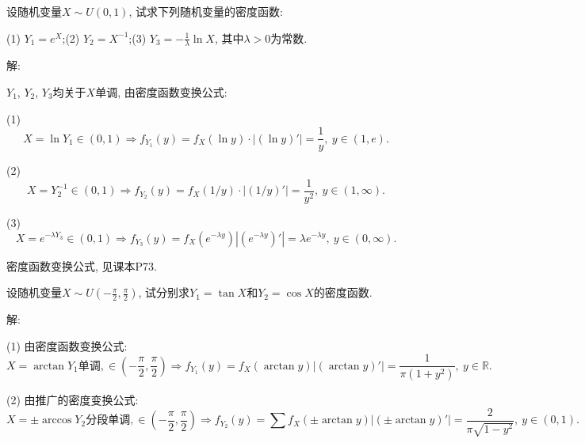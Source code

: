 \documentclass[standard]{ExBook}
\begin{document}
\begin{qitems}
\vspace{-5em}

    \begin{bbox}
    \begin{shaded}
        \qitem
设随机变量$X\sim U(0,1)$, 试求下列随机变量的密度函数:

(1) $Y_{1}=e^X$;\qquad(2) $Y_{2}=X^{-1}$;\qquad(3) $Y_{3}=-\frac{1}{\lambda}\ln X$, 其中$\lambda > 0$为常数.
    \end{shaded}
    \end{bbox}

\vspace{-5em}

    \begin{bbox}
解: 

$Y_1$, $Y_2$, $Y_3$均关于$X$单调, 由密度函数变换公式:

(1) $$X=\ln Y_1\in(0,1) \Longrightarrow f_{Y_1}(y)=f_{X}(\ln y)\cdot|(\ln y)'|=\displaystyle\frac{1}{y},\ y\in(1,e).$$

(2) $$X=Y_{2}^{-1}\in(0,1) \Longrightarrow f_{Y_2}(y)=f_{X}(1/y)\cdot|(1/y)'|=\displaystyle\frac{1}{y^2},\ y\in(1,\infty).$$

(3) $$X=e^{-\lambda Y_3}\in(0,1) \Longrightarrow f_{Y_3}(y)=f_{X}(e^{-\lambda y})|(e^{-\lambda y})'|=\lambda e^{-\lambda y},\ y\in(0,\infty).$$

\textcolor{themeColor}{\selectfont {} 密度函数变换公式, 见课本P73.}
    \end{bbox}

\vspace{-5em}

    \begin{bbox}
    \begin{shaded}
        \qitem
设随机变量$\displaystyle X\sim U(-\frac{\pi}{2},\frac{\pi}{2})$, 试分别求$Y_{1}=\tan X$和$Y_{2}=\cos X$的密度函数.
    \end{shaded}
    \end{bbox}

\vspace{-5em}

    \begin{bbox}
解: 

(1) 由密度函数变换公式:
$$X=\arctan Y_1\text{单调}, \in(-\displaystyle\frac{\pi}{2},\displaystyle\frac{\pi}{2}) \Longrightarrow f_{Y_1}(y)=f_{X}(\arctan y)|(\arctan y)'|=\frac{1}{\pi(1+y^2)},\ y\in\mathbb{R}.$$

(2) 由推广的密度变换公式:
$$X=\pm\arccos Y_2\text{分段单调}, \in(-\displaystyle\frac{\pi}{2},\displaystyle\frac{\pi}{2}) \Longrightarrow f_{Y_2}(y)=\sum f_{X}(\pm\arctan y)|(\pm\arctan y)'|=\frac{2}{\pi\sqrt{1-y^2}},\ y\in(0,1).$$


\end{bbox}
\end{qitems}
\end{document}
